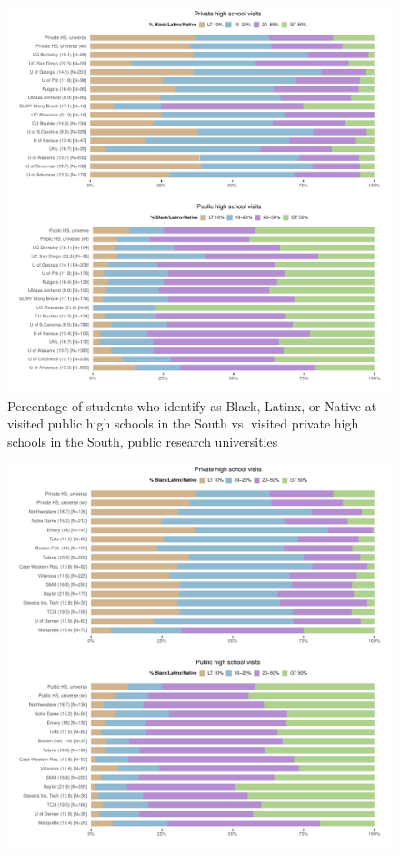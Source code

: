 \documentclass[
  12pt,
]{article}
\begin{document}
\begin{landscape}
\begin{figure}
{\centering \includegraphics[width=2\linewidth]{./south_race_pubu_privhs_pubhs} 

}

\caption{Percentage of students who identify as Black, Latinx, or Native at visited public high schools in the South vs. visited private high schools in the South, public research universities}\label{fig:south-race-pubu-privhs-pubhs}
\end{figure}

\newpage

\begin{figure}

{\centering \includegraphics[width=2\linewidth]{./south_race_privu_privhs_pubhs} 

}
\end{figure}
\end{landscape}
\end{document}
